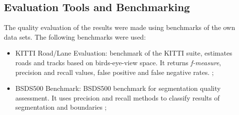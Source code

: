 \subsection{Evaluation Tools and Benchmarking}
\label{cap5_formas_avaliacao}

The quality evaluation of the results were made using benchmarks of the own data sets. %
The following benchmarks were used:

\begin{itemize}
 \item KITTI Road/Lane Evaluation: benchmark of the KITTI suite, estimates roads and tracks based on birds-eye-view space. It returns \textit{f-measure}, precision and recall values, false positive and false negative rates. \cite{Fritsch2013ITSC};
 
 \item BSDS500 Benchmark: BSDS500 benchmark for segmentation quality assessment. It uses precision and recall methods to classify results of segmentation and boundaries \cite{amfm_pami2011};
 
\end{itemize}

